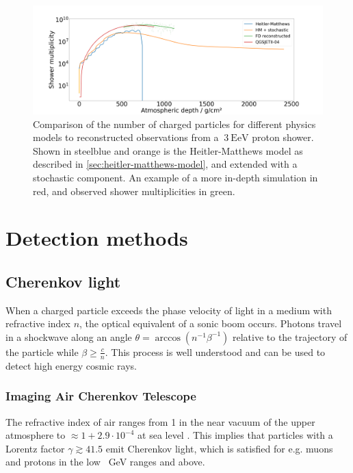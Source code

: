 \begin{figure}
	\centering
	\includegraphics[width=1.0\textwidth]{./plots/validity_plot.png}
	\caption{Comparison of the number of charged particles for different physics models to reconstructed observations from a $~\SI{3}{\exa\electronvolt}$ proton 
	shower. Shown in steelblue and orange is the Heitler-Matthews model as described in \autoref{sec:heitler-matthews-model}, and extended with a stochastic 
	component. An example of a more in-depth simulation in red, and observed shower multiplicities in green.}
	\label{fig:model-validity}
\end{figure}

\section{Detection methods}
\label{sec:detection-methods}

\subsection{Cherenkov light}
\label{ssec:cherenkov-light}

When a charged particle exceeds the phase velocity of light in a medium with refractive index $n$, the optical equivalent of a sonic boom occurs. Photons travel in a 
shockwave along an angle $\theta = \arccos\left(n^{-1}\beta^{-1}\right)$ relative to the trajectory of the particle while $\beta \geq \frac{c}{n}$. This process is 
well understood and can be used to detect high energy cosmic rays.

\subsubsection{Imaging Air Cherenkov Telescope}

The refractive index of air ranges from 1 in the near vacuum of the upper atmosphere to $\approx1+2.9\cdot10^{-4}$ at sea level \cite{andrews1992analytical}. This
implies that particles with a Lorentz factor $\gamma \gtrsim 41.5$ emit Cherenkov light, which is satisfied for e.g. muons and protons in the low 
\SI{}{\giga\electronvolt} ranges and above.

